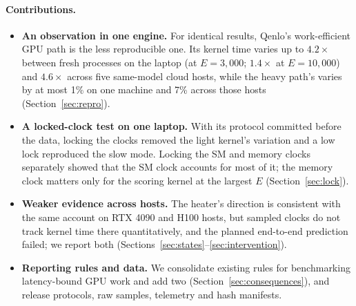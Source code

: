 \documentclass[10pt,twocolumn]{article}
\begin{document}
\paragraph{Contributions.}
\begin{itemize}
\item \textbf{An observation in one engine.} For identical results, Qenlo's work-efficient GPU path is the less reproducible one. Its kernel time varies up to $4.2\times$ between fresh processes on the laptop (at $E=3{,}000$; $1.4\times$ at $E=10{,}000$) and $4.6\times$ across five same-model cloud hosts, while the heavy path's varies by at most 1\% on one machine and 7\% across those hosts (Section~\ref{sec:repro}).
\item \textbf{A locked-clock test on one laptop.} With its protocol committed before the data, locking the clocks removed the light kernel's variation and a low lock reproduced the slow mode. Locking the SM and memory clocks separately showed that the SM clock accounts for most of it; the memory clock matters only for the scoring kernel at the largest $E$ (Section~\ref{sec:lock}).
\item \textbf{Weaker evidence across hosts.} The heater's direction is consistent with the same account on RTX 4090 and H100 hosts, but sampled clocks do not track kernel time there quantitatively, and the planned end-to-end prediction failed; we report both (Sections~\ref{sec:states}--\ref{sec:intervention}).
\item \textbf{Reporting rules and data.} We consolidate existing rules for benchmarking latency-bound GPU work and add two (Section~\ref{sec:consequences}), and release protocols, raw samples, telemetry and hash manifests.
\end{itemize}






\end{document}
